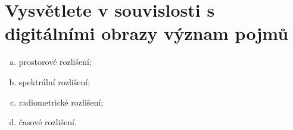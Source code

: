 \section{Vysvětlete v souvislosti s digitálními obrazy význam pojmů} 
\begin{enumerate}[a)]
    \item prostorové rozlišení;
    \item spektrální rozlišení;
    \item radiometrické rozlišení;
    \item časové rozlišení.
\end{enumerate}
